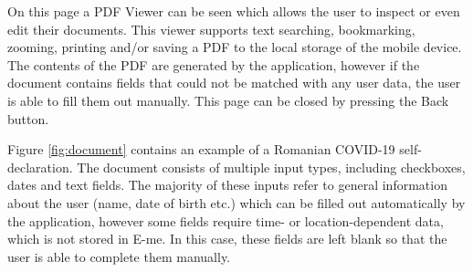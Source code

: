 	On this page a PDF Viewer can be seen which allows the user to inspect or even edit their documents.
	This viewer supports text searching, bookmarking, zooming, printing and/or saving a PDF to the local storage of the mobile device.
	The contents of the PDF are generated by the application, however if the document contains fields that could not be matched with any user data,
	the user is able to fill them out manually. This page can be closed by pressing the Back button.

	Figure \ref{fig:document} contains an example of a Romanian COVID-19 self-declaration.
	The document consists of multiple input types, including checkboxes, dates and text fields.
	The majority of these inputs refer to general information about the user (name, date of birth etc.) which can be filled out automatically by the application,
	 however some fields require time- or location-dependent data, which is not stored in E-me.
	 In this case, these fields are left blank so that the user is able to complete them manually.